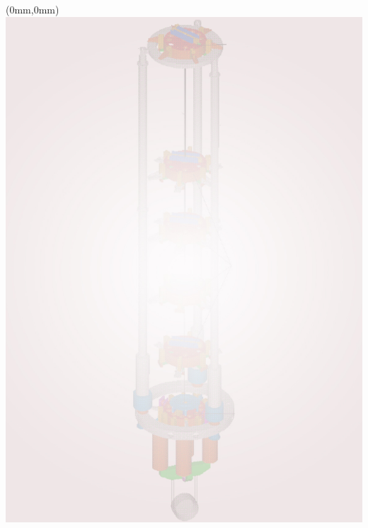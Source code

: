 \documentclass[color,DIV12,pdftex,a4paper]{ET-DS}
\begin{document}
\FloatBarrier

%
\cleardoublepage 
\FloatBarrier
%
%
\begin{textblock*}{297mm}(0mm,0mm)   \includegraphics[width=\paperwidth]{Sec_Suspensions/Figures/SuspensionBackgroundFirstPage.jpg}
\end{textblock*}
%
\end{document}

